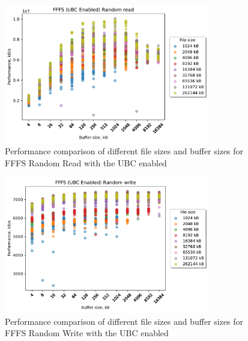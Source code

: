 \begin{figure}[!htb]
	\label{fig:bench_fffs_no_ubc_scatter_rnd_read}
	\begin{center}
		\includegraphics[width=0.8\textwidth]{figures.nosync/benchmarking/FFFS/scatter-UBC Enabled-Random read.pdf}
	\end{center}
	\caption[Comparison of Random Read performance for file size and buffer size of FFFS with the UBC disabled]{Performance comparison of different file sizes and buffer sizes for FFFS Random Read with the UBC enabled}
\end{figure}
\begin{figure}[!htb]
	\label{fig:bench_fffs_no_ubc_scatter_rnd_write}
	\begin{center}
		\includegraphics[width=0.8\textwidth]{figures.nosync/benchmarking/FFFS/scatter-UBC Enabled-Random write.pdf}
	\end{center}
	\caption[Comparison of Random Write performance for file size and buffer size of FFFS with the UBC disabled]{Performance comparison of different file sizes and buffer sizes for FFFS Random Write with the UBC enabled}
\end{figure}
\clearpage



